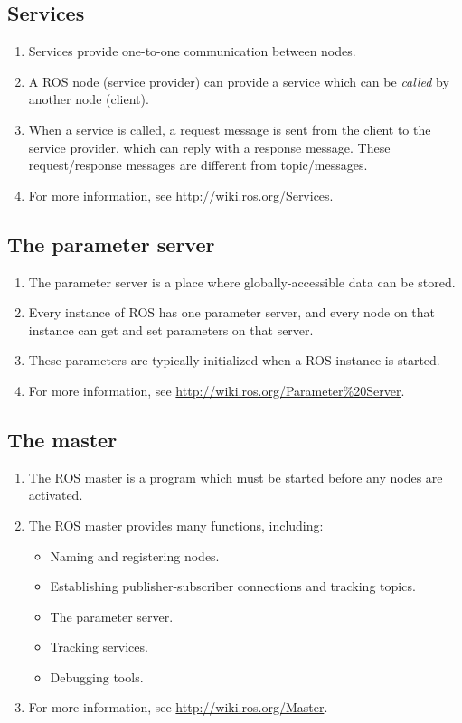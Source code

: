 \documentclass{article}
\begin{document}
        \subsection{Services}
            \begin{enumerate}
                \item Services provide one-to-one communication between nodes.
                \item A ROS node (service provider) can provide a service which can be \emph{called}
                by another node (client).
                \item When a service is called, a request message is sent from the client to the service provider,
                which can reply with a response message. These request/response messages are different from topic/messages. 
                \item For more information, see \url{http://wiki.ros.org/Services}.
            \end{enumerate}
        \subsection{The parameter server}
            \begin{enumerate}
                \item The parameter server is a place where globally-accessible data can be stored.
                \item Every instance of ROS has one parameter server, and every node on that instance can 
                get and set parameters on that server.
                \item These parameters are typically initialized when a ROS instance is started.
                \item For more information, see \url{http://wiki.ros.org/Parameter%20Server}.
            \end{enumerate}
        \subsection{The master}
            \begin{enumerate}
                \item The ROS master is a program which must be started before any nodes are activated.
                \item The ROS master provides many functions, including:
                \begin{itemize}
                    \item Naming and registering nodes.
                    \item Establishing publisher-subscriber connections and tracking topics.
                    \item The parameter server.
                    \item Tracking services.
                    \item Debugging tools.
                \end{itemize}
                \item For more information, see \url{http://wiki.ros.org/Master}.
            \end{enumerate}
    \newpage
\end{document}

